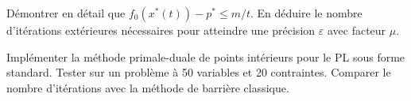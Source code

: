 \begin{exercice}
D\'emontrer en d\'etail que $f_0(x^*(t)) - p^* \leq m/t$. En d\'eduire le
nombre d'it\'erations ext\'erieures n\'ecessaires pour atteindre une
pr\'ecision $\varepsilon$ avec facteur $\mu$.
\end{exercice}

\begin{exercice}
Impl\'ementer la m\'ethode primale-duale de points int\'erieurs pour le PL
sous forme standard. Tester sur un probl\`eme \`a 50 variables et 20
contraintes. Comparer le nombre d'it\'erations avec la m\'ethode de
barri\`ere classique.
\end{exercice}
